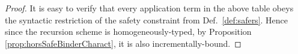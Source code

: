 \documentclass[a4paper]{article}[12pt]
\theoremstyle{remark}
\theoremstyle{definition}
\begin{document}
\begin{proof}
It is easy to verify that every application term in the above table obeys the syntactic restriction of the safety constraint from Def.\ \ref{def:safers}.
Hence since the recursion scheme is homogeneously-typed, by Proposition \ref{prop:horsSafeBinderCharact}, it is also incrementally-bound.
\end{proof}



\end{document}
